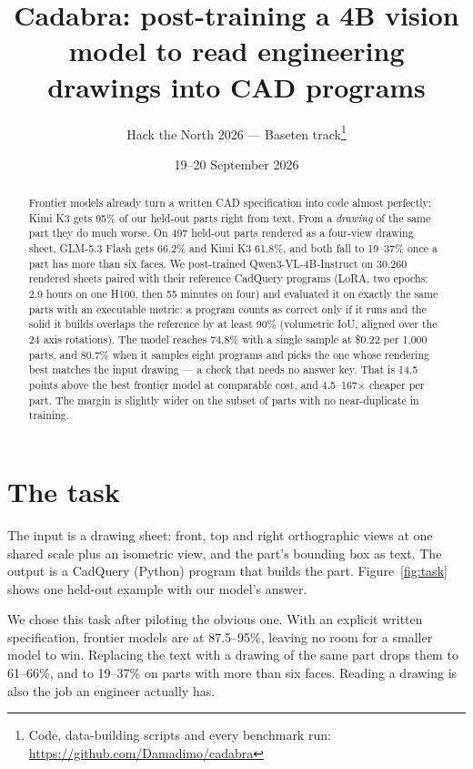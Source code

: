 \documentclass[11pt]{article}
\title{Cadabra: post-training a 4B vision model to read engineering
drawings into CAD programs}
\author{Hack the North 2026 --- Baseten track\thanks{Code, data-building scripts and every benchmark run:
\url{https://github.com/Damadimo/cadabra}}}
\date{19--20 September 2026}
\begin{document}
\maketitle

\begin{abstract}
Frontier models already turn a written CAD specification into code almost perfectly: Kimi K3 gets 95\% of our
held-out parts right from text. From a \emph{drawing} of the same part they do much worse. On 497 held-out parts
rendered as a four-view drawing sheet, GLM-5.3 Flash gets 66.2\% and Kimi K3 61.8\%, and both fall to 19--37\% once a
part has more than six faces. We post-trained Qwen3-VL-4B-Instruct on 30{,}260 rendered sheets paired with their
reference CadQuery programs (LoRA, two epochs: 2.9 hours on one H100, then 55 minutes on four) and evaluated it on
exactly the same parts with an executable metric: a program counts as correct only if it runs and the solid it builds
overlaps the reference by at least 90\% (volumetric IoU, aligned over the 24 axis rotations). The model reaches
74.8\% with a single sample at \$0.22 per 1{,}000 parts, and 80.7\% when it samples eight programs and picks the one
whose rendering best matches the input drawing --- a check that needs no answer key. That is 14.5 points above the
best frontier model at comparable cost, and 4.5--167$\times$ cheaper per part. The margin is slightly wider on the
subset of parts with no near-duplicate in training.
\end{abstract}

\section{The task}

The input is a drawing sheet: front, top and right orthographic views at one shared scale plus an isometric view, and
the part's bounding box as text. The output is a CadQuery (Python) program that builds the part. Figure~\ref{fig:task}
shows one held-out example with our model's answer.

We chose this task after piloting the obvious one. With an explicit written specification, frontier models are at
87.5--95\%, leaving no room for a smaller model to win. Replacing the text with a drawing of the same part drops them
to 61--66\%, and to 19--37\% on parts with more than six faces. Reading a drawing is also the job an engineer
actually has.
\end{document}
